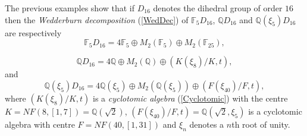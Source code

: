 \documentclass[a4paper,11pt]{report}
\begin{document}
{{ The previous examples show that if $D_{16}$ denotes the dihedral group of order $16$ then the \emph{Wedderburn decomposition} (\ref{WedDec}) of $\mathbb F_5 D_{16}$, ${\ensuremath{\mathbb Q}} D_{16}$ and ${\ensuremath{\mathbb Q}} (\xi_5) D_{16}$ are respectively 
\[ \mathbb F_5 D_{16} = 4 \mathbb F_5 \oplus M_2( \mathbb F_5 ) \oplus M_2(
\mathbb F_{25} ), \]
 
\[ {\ensuremath{\mathbb Q}} D_{16} = 4 {\ensuremath{\mathbb Q}} \oplus M_2(
{\ensuremath{\mathbb Q}} ) \oplus (K(\xi_8)/K,t), \]
 and 
\[ {\ensuremath{\mathbb Q}} (\xi_5) D_{16} = 4 {\ensuremath{\mathbb Q}} (\xi_5)
\oplus M_2( {\ensuremath{\mathbb Q}} (\xi_5) ) \oplus (F(\xi_{40})/F,t), \]
 where $(K(\xi_8)/K,t)$ is a \emph{cyclotomic algebra} (\ref{Cyclotomic}) with the centre $K=NF(8,[ 1, 7 ])= {\ensuremath{\mathbb Q}} (\sqrt{2})$, $(F(\xi_{40})/F,t) = {\ensuremath{\mathbb Q}} (\sqrt{2},\xi_5)$ is a cyclotomic algebra with centre $F=NF(40,[ 1, 31 ])$ and $\xi_n$ denotes a $n$\texttt{}th root of unity. 

}}
\end{document}

